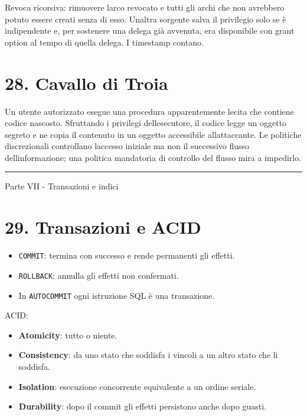 \documentclass[
  10pt,
  a4paper,
]{article}
\providecommand{\tightlist}{%
  \setlength{\itemsep}{0pt}\setlength{\parskip}{0pt}}
\begin{document}
Revoca ricorsiva: rimuovere l\textquotesingle arco revocato e tutti gli
archi che non avrebbero potuto essere creati senza di esso.
Un\textquotesingle altra sorgente salva il privilegio solo se è
indipendente e, per sostenere una delega già avvenuta, era disponibile
con grant option al tempo di quella delega. I timestamp contano.

\section{28. Cavallo di Troia}\label{28-cavallo-di-troia}

Un utente autorizzato esegue una procedura apparentemente lecita che
contiene codice nascosto. Sfruttando i privilegi
dell\textquotesingle esecutore, il codice legge un oggetto segreto e ne
copia il contenuto in un oggetto accessibile
all\textquotesingle attaccante. Le politiche discrezionali controllano
l\textquotesingle accesso iniziale ma non il successivo flusso
dell\textquotesingle informazione; una politica mandatoria di controllo
del flusso mira a impedirlo.

\begin{center}\rule{0.5\linewidth}{0.5pt}\end{center}

Parte VII - Transazioni e indici

\section{29. Transazioni e ACID}\label{29-transazioni-e-acid}

\begin{itemize}
\tightlist
\item
  \texttt{COMMIT}: termina con successo e rende permanenti gli effetti.
\item
  \texttt{ROLLBACK}: annulla gli effetti non confermati.
\item
  In \texttt{AUTOCOMMIT} ogni istruzione SQL è una transazione.
\end{itemize}

ACID:

\begin{itemize}
\tightlist
\item
  \textbf{Atomicity}: tutto o niente.
\item
  \textbf{Consistency}: da uno stato che soddisfa i vincoli a un altro
  stato che li soddisfa.
\item
  \textbf{Isolation}: esecuzione concorrente equivalente a un ordine
  seriale.
\item
  \textbf{Durability}: dopo il commit gli effetti persistono anche dopo
  guasti.
\end{itemize}
\end{document}
